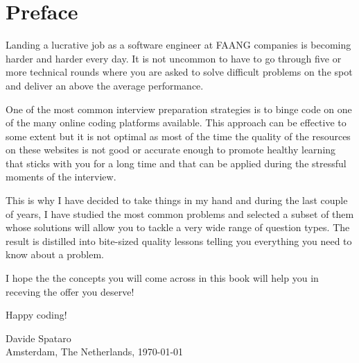 \chapter*{Preface}

Landing a lucrative job as a software engineer at FAANG companies is becoming harder and harder every day. It is not uncommon to have to go through  five or more technical rounds where you are asked to solve difficult problems on the spot and deliver an above the average performance.

One of the most common interview preparation strategies is to binge code on one of the many online coding platforms available.
This approach can be effective to some extent but it is not optimal as most of the time the quality of the resources on these websites is not good or accurate enough to promote healthy learning that sticks with you for a long time and that can be applied during the stressful moments of the interview.

This is why I have decided to take things in my hand and during the last couple of years, I have studied the most common problems and selected a subset of them whose solutions will allow you to tackle a very wide range of question types. The result is distilled into bite-sized quality lessons telling you everything you need to know about a problem.

I hope the the concepts you will come across in this book will help you in receving the offer you deserve!

Happy coding!


\medskip
\begin {flushright}
  Davide Spataro \hfill \\
  Amsterdam, The Netherlands, \today
\end {flushright}